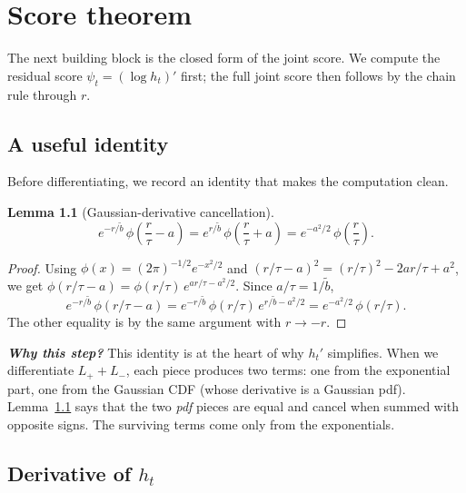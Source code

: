 \documentclass[11pt,a4paper,openany]{book}
\theoremstyle{plainserif}
\newtheorem{lemma}[theorem]{Lemma}
\theoremstyle{definition}
\theoremstyle{remarkstyle}
\newenvironment{whybox}{%
  \begin{center}\begin{minipage}{0.95\linewidth}\small
  \textbf{\textit{Why this step?}}\quad\ignorespaces}{%
  \end{minipage}\end{center}}
\newcommand{\btilde}{\tilde{b}}
\begin{document}
\chapter{Score theorem}
\label{ch:score}

The next building block is the closed form of the joint score. We compute
the residual score $\psi_t = (\log h_t)'$ first; the full joint score
then follows by the chain rule through $r$.

\section{A useful identity}

Before differentiating, we record an identity that makes the computation
clean.

\begin{lemma}[Gaussian-derivative cancellation]
\label{lem:gaussian-id}
\begin{equation}
e^{-r/\btilde}\,\phi\!\left(\frac{r}{\tau}-a\right)
= e^{r/\btilde}\,\phi\!\left(\frac{r}{\tau}+a\right)
= e^{-a^2/2}\,\phi\!\left(\frac{r}{\tau}\right).
\label{eq:gauss-id}
\end{equation}
\end{lemma}

\begin{proof}
Using $\phi(x) = (2\pi)^{-1/2}e^{-x^2/2}$ and
$(r/\tau - a)^2 = (r/\tau)^2 - 2ar/\tau + a^2$, we get
$\phi(r/\tau - a) = \phi(r/\tau)\, e^{ar/\tau - a^2/2}$.
Since $a/\tau = 1/\btilde$,
\begin{equation}
e^{-r/\btilde}\,\phi(r/\tau - a) = e^{-r/\btilde}\,\phi(r/\tau)\,e^{r/\btilde - a^2/2}
  = e^{-a^2/2}\,\phi(r/\tau).
\end{equation}
The other equality is by the same argument with $r\to -r$.
\end{proof}

\begin{whybox}
This identity is at the heart of why $h_t'$ simplifies. When we
differentiate $L_+ + L_-$, each piece produces two terms: one from the
exponential part, one from the Gaussian CDF (whose derivative is a
Gaussian pdf). Lemma~\ref{lem:gaussian-id} says that the two
\emph{pdf} pieces are equal and cancel when summed with opposite signs.
The surviving terms come only from the exponentials.
\end{whybox}

\section{Derivative of $h_t$}
\end{document}
